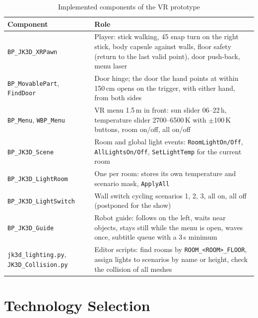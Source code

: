 \begin{table}[H]
\centering
\begin{tightblock}
\footnotesize
\begin{tabularx}{\textwidth}{P{3.6cm} L}
\toprule
\textbf{Component} & \textbf{Role} \\
\midrule
\texttt{BP\_JK3D\_XRPawn} & Player: stick walking, 45\textdegree{} snap turn on the right stick, body capsule against walls, floor safety (return to the last valid point), door push-back, menu laser \\
\texttt{BP\_MovablePart}, \texttt{FindDoor} & Door hinge; the door the hand points at within 150\,cm opens on the trigger, with either hand, from both sides \\
\texttt{BP\_Menu}, \texttt{WBP\_Menu} & VR menu 1.5\,m in front: sun slider 06--22\,h, temperature slider 2700--6500\,K with $\pm$100\,K buttons, room on/off, all on/off \\
\texttt{BP\_JK3D\_Scene} & Room and global light events: \texttt{RoomLightOn/Off}, \texttt{AllLightsOn/Off}, \texttt{SetLightTemp} for the current room \\
\texttt{BP\_JK3D\_LightRoom} & One per room: stores its own temperature and scenario mask, \texttt{ApplyAll} \\
\texttt{BP\_JK3D\_LightSwitch} & Wall switch cycling scenarios 1, 2, 3, all on, all off (postponed for the show) \\
\texttt{BP\_JK3D\_Guide} & Robot guide: follows on the left, waits near objects, stays still while the menu is open, waves once, subtitle queue with a 3\,s minimum \\
\texttt{jk3d\_lighting.py}, \texttt{JK3D\_Collision.py} & Editor scripts: find rooms by \texttt{ROOM\_<ROOM>\_FLOOR}, assign lights to scenarios by name or height, check the collision of all meshes \\
\bottomrule
\end{tabularx}
\end{tightblock}
\caption{Implemented components of the VR prototype}
\label{tab:components}
\end{table}

\section{Technology Selection}

